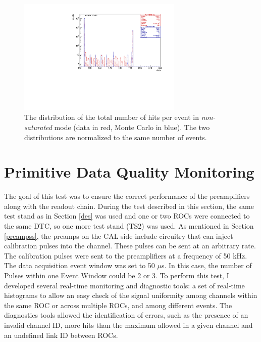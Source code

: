 \begin{figure}[!h]
\centering
\includegraphics[width =0.7\textwidth]{figures/pdf/figure_00009_nhits_105038.pdf}
\caption{
  The distribution of the total number of hits per event in \textit{non-saturated} mode 
  (data in red, Monte Carlo in blue). The two distributions 
  are normalized to the same number of events.
}
\label{fig:6}
\end{figure}


\section{Primitive Data Quality Monitoring}\label{dqm}
The goal of this test was to ensure the correct performance of the 
preamplifiers along with the readout chain.
During the test described in this section, the same test stand as 
in Section \ref{des} was used and one or two ROCs 
were connected to the same DTC, so one more test stand (TS2) was used. 
As mentioned in Section \ref{preampss}, the preamps on the CAL side 
include circuitry that can inject calibration pulses into the channel. 
These pulses can be sent at an arbitrary rate.
The calibration pulses were sent to the preamplifiers at a frequency of 50 kHz. 
The data acquisition event window was set to 50 $\mu$s. 
In this case, the number of Pulses within one Event Window could be 2 or 3.
To perform this test, I developed several real-time monitoring and diagnostic tools: 
a set of real-time histograms to allow an easy check of the signal uniformity among 
channels within the same ROC or across multiple ROCs, and among different events.
The diagnostics tools allowed the identification of errors, such as the presence of an 
invalid channel ID, more hits than the maximum allowed in a given channel 
and an undefined link ID between ROCs.

